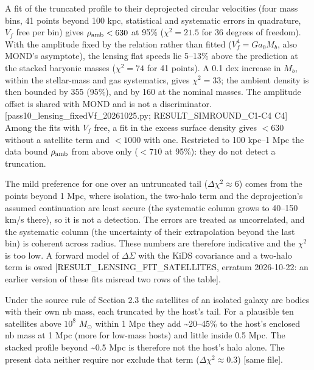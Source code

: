 \documentclass[
  10pt,
]{article}
\begin{document}
A fit of the truncated profile to their deprojected circular velocities (four mass bins, 41 points beyond 100 kpc, statistical and systematic errors in quadrature, $V_f$ free per bin) gives $\rho_{\rm amb}<630$ at 95\% ($\chi^2=21.5$ for 36 degrees of freedom). With the amplitude fixed by the relation rather than fitted ($V_f^4=Ga_0M_b$, also MOND's asymptote), the lensing flat speeds lie 5--13\% above the prediction at the stacked baryonic masses ($\chi^2=74$ for 41 points). A 0.1 dex increase in $M_b$, within the stellar-mass and gas systematics, gives $\chi^2=33$; the ambient density is then bounded by 355 (95\%), and by 160 at the nominal masses. The amplitude offset is shared with MOND and is not a discriminator. {[}pass10\_lensing\_fixedVf\_20261025.py; RESULT\_SIMROUND\_C1-C4 C4{]} Among the fits with $V_f$ free, a fit in the excess surface density gives $<630$ without a satellite term and $<1000$ with one. Restricted to 100 kpc--1 Mpc the data bound $\rho_{\rm amb}$ from above only ($<710$ at 95\%): they do not detect a truncation.

The mild preference for one over an untruncated tail ($\Delta\chi^2\approx6$) comes from the points beyond 1 Mpc, where isolation, the two-halo term and the deprojection's assumed continuation are least secure (the systematic column grows to 40--150 km/s there), so it is not a detection. The errors are treated as uncorrelated, and the systematic column (the uncertainty of their extrapolation beyond the last bin) is coherent across radius. These numbers are therefore indicative and the $\chi^2$ is too low. A forward model of $\Delta\Sigma$ with the KiDS covariance and a two-halo term is owed {[}RESULT\_LENSING\_FIT\_SATELLITES, erratum 2026-10-22: an earlier version of these fits misread two rows of the table{]}.

Under the source rule of Section 2.3 the satellites of an isolated galaxy are bodies with their own nb mass, each truncated by the host's tail. For a plausible ten satellites above $10^{8}$ $M_\odot$ within 1 Mpc they add \textasciitilde{}20--45\% to the host's enclosed nb mass at 1 Mpc (more for low-mass hosts) and little inside 0.5 Mpc. The stacked profile beyond \textasciitilde{}0.5 Mpc is therefore not the host's halo alone. The present data neither require nor exclude that term ($\Delta\chi^2\approx0.3$) {[}same file{]}.
\end{document}
